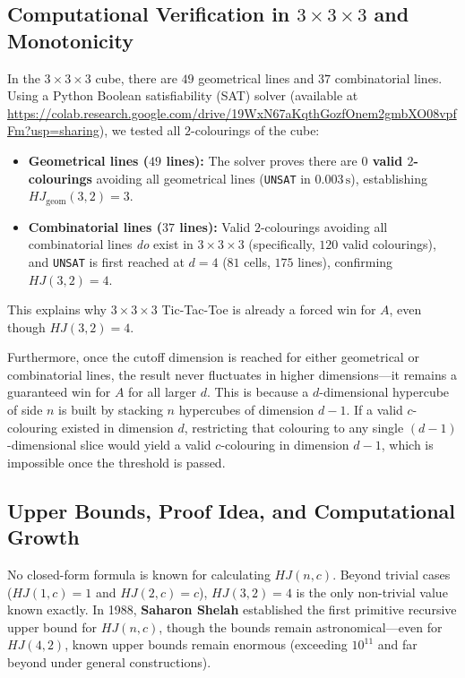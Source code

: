 \documentclass[11pt, a4paper]{article}
\begin{document}
\subsection{Computational Verification in $3 \times 3 \times 3$ and Monotonicity}
In the $3 \times 3 \times 3$ cube, there are $49$ geometrical lines and $37$ combinatorial lines. Using a Python Boolean satisfiability (SAT) solver (available at \url{https://colab.research.google.com/drive/19WxN67aKqthGozfOnem2gmbXO08vpfFm?usp=sharing}), we tested all $2$-colourings of the cube:
\begin{itemize}
    \item \textbf{Geometrical lines ($49$ lines):} The solver proves there are \textbf{$0$ valid $2$-colourings} avoiding all geometrical lines (\texttt{UNSAT} in $0.003\,\mathrm{s}$), establishing $HJ_{\mathrm{geom}}(3, 2) = 3$.
    \item \textbf{Combinatorial lines ($37$ lines):} Valid $2$-colourings avoiding all combinatorial lines \emph{do} exist in $3 \times 3 \times 3$ (specifically, $120$ valid colourings), and \texttt{UNSAT} is first reached at $d = 4$ ($81$ cells, $175$ lines), confirming $HJ(3, 2) = 4$.
\end{itemize}
This explains why $3 \times 3 \times 3$ Tic-Tac-Toe is already a forced win for $A$, even though $HJ(3, 2) = 4$.

Furthermore, once the cutoff dimension is reached for either geometrical or combinatorial lines, the result never fluctuates in higher dimensions—it remains a guaranteed win for $A$ for all larger $d$. This is because a $d$-dimensional hypercube of side $n$ is built by stacking $n$ hypercubes of dimension $d - 1$. If a valid $c$-colouring existed in dimension $d$, restricting that colouring to any single $(d - 1)$-dimensional slice would yield a valid $c$-colouring in dimension $d - 1$, which is impossible once the threshold is passed.

\subsection{Upper Bounds, Proof Idea, and Computational Growth}
No closed-form formula is known for calculating $HJ(n, c)$. Beyond trivial cases ($HJ(1, c) = 1$ and $HJ(2, c) = c$), $HJ(3, 2) = 4$ is the only non-trivial value known exactly. In 1988, \textbf{Saharon Shelah} established the first primitive recursive upper bound for $HJ(n, c)$, though the bounds remain astronomical—even for $HJ(4, 2)$, known upper bounds remain enormous (exceeding $10^{11}$ and far beyond under general constructions).
\end{document}
